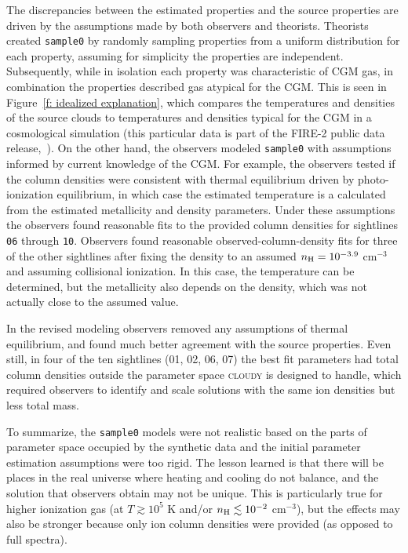 \documentclass[fleqn,usenatbib]{mnras}
\begin{document}
The discrepancies between the estimated properties and the source properties are driven by the assumptions made by both observers and theorists.
Theorists created \texttt{sample0} by randomly sampling properties from a uniform distribution for each property, assuming for simplicity the properties are independent.
Subsequently, while in isolation each property was characteristic of CGM gas, in combination the properties described gas atypical for the CGM.
This is seen in Figure~\ref{f: idealized explanation}, which compares the temperatures and densities of the source clouds to temperatures and densities typical for the CGM in a cosmological simulation (this particular data is part of the FIRE-2 public data release,~\citealt{wetzel2022Public}).
On the other hand, the observers modeled \texttt{sample0} with assumptions informed by current knowledge of the CGM.
For example, the observers tested if the column densities were consistent with thermal equilibrium driven by photo-ionization equilibrium, in which case the estimated temperature is a calculated from the estimated metallicity and density parameters.
Under these assumptions the observers found reasonable fits to the provided column densities for sightlines \texttt{06} through \texttt{10}.
Observers found reasonable observed-column-density fits for three of the other sightlines after fixing the density to an assumed $n_{\rm H} = 10^{-3.9}$ cm$^{-3}$ and assuming collisional ionization.
In this case, the temperature can be determined, but the metallicity also depends on the density,
which was not actually close to the assumed value.

In the revised modeling observers removed any assumptions of thermal equilibrium, and found much better agreement with the source properties.
Even still, in four of the ten sightlines (\textsc{01}, \textsc{02}, \textsc{06}, \textsc{07}) the best fit parameters had total  column densities outside the parameter space \textsc{cloudy} is designed to handle, which required observers to identify and scale solutions with the same ion densities but less total mass.

To summarize, the \texttt{sample0} models were not realistic based on the parts of parameter space occupied by the synthetic data and the initial parameter estimation assumptions were too rigid.
The lesson learned is that there will be places in the real universe where heating and cooling do not balance, and the solution that observers obtain may not be unique.
This is particularly true for higher ionization gas (at $T \gtrsim 10^{5}$ K and/or $n_{\rm H} \lesssim 10^{-2}$ cm$^{-3}$),
but the effects may also be stronger because only ion column densities were provided (as opposed to full spectra).
\end{document}
